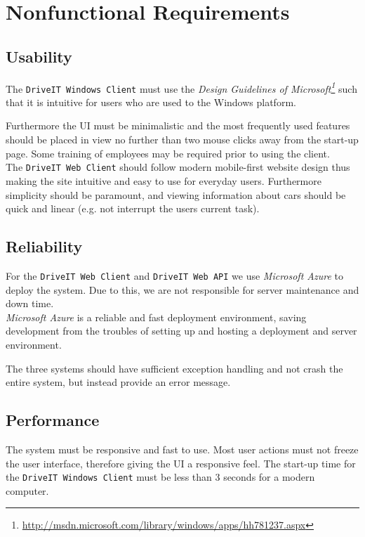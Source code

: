 \section{Nonfunctional Requirements}
\subsection{Usability}
The \texttt{DriveIT Windows Client} must use the \textit{Design Guidelines of Microsoft\footnote{\url{http://msdn.microsoft.com/library/windows/apps/hh781237.aspx}}} such that it is intuitive for users who are used to the Windows platform.

Furthermore the UI must be minimalistic and the most frequently used features should be placed in view no further than two mouse clicks away from the start-up page. Some training of employees may be required prior to using the client.\\

The \texttt{DriveIT Web Client} should follow modern mobile-first website design thus making the site intuitive and easy to use for everyday users. Furthermore simplicity should be paramount, and viewing information about cars should be quick and linear (e.g. not interrupt the users current task).

\subsection{Reliability}
For the \texttt{DriveIT Web Client} and \texttt{DriveIT Web API} we use \textit{Microsoft Azure} to deploy the system. Due to this, we are not responsible for server maintenance and down time. \\
\textit{Microsoft Azure} is a reliable and fast deployment environment, saving development from the troubles of setting up and hosting a deployment and server environment.

The three systems should have sufficient exception handling and not crash the entire system, but instead provide an error message.

\subsection{Performance}
The system must be responsive and fast to use. Most user actions must not freeze the user interface, therefore giving the UI a responsive feel. The start-up time for the \texttt{DriveIT Windows Client} must be less than 3 seconds for a modern computer.

